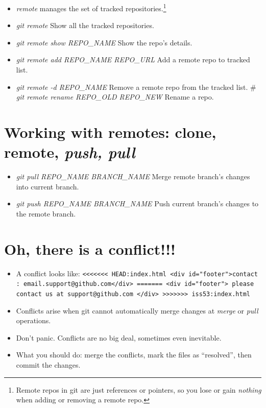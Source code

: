 \documentclass[]{article}
\begin{document}
\begin{itemize}
\item
  \emph{remote} manages the set of tracked repositories.\footnote{Remote
    repos in git are just references or pointers, so you lose or gain
    \emph{nothing} when adding or removing a remote repo.}
\item
  \emph{git remote} Show all the tracked repositories.
\item
  \emph{git remote show REPO\_NAME} Show the repo's details.
\item
  \emph{git remote add REPO\_NAME REPO\_URL} Add a remote repo to
  tracked list.
\item
  \emph{git remote -d REPO\_NAME} Remove a remote repo from the tracked
  list. \# \emph{git remote rename REPO\_OLD REPO\_NEW} Rename a repo.
\end{itemize}
\section{Working with \textbf{remotes}: clone, remote, \emph{push,
pull}}

\begin{itemize}
\item
  \emph{git pull REPO\_NAME BRANCH\_NAME} Merge remote branch's changes
  into current branch.
\item
  \emph{git push REPO\_NAME BRANCH\_NAME} Push current branch's changes
  to the remote branch.
\end{itemize}
\section{Oh, there is a conflict!!!}

\begin{itemize}
\item
  A conflict looks like:
  \texttt{\textless{}\textless{}\textless{}\textless{}\textless{}\textless{}\textless{} HEAD:index.html \textless{}div id="footer"\textgreater{}contact : email.support@github.com\textless{}/div\textgreater{} ======= \textless{}div id="footer"\textgreater{}   please contact us at support@github.com \textless{}/div\textgreater{} \textgreater{}\textgreater{}\textgreater{}\textgreater{}\textgreater{}\textgreater{}\textgreater{} iss53:index.html}
\item
  Conflicts arise when git cannot automatically merge changes at
  \emph{merge} or \emph{pull} operations.
\item
  Don't panic. Conflicts are no big deal, sometimes even inevitable.
\item
  What you should do: merge the conflicts, mark the files as
  ``resolved'', then commit the changes.
\end{itemize}
\end{document}
